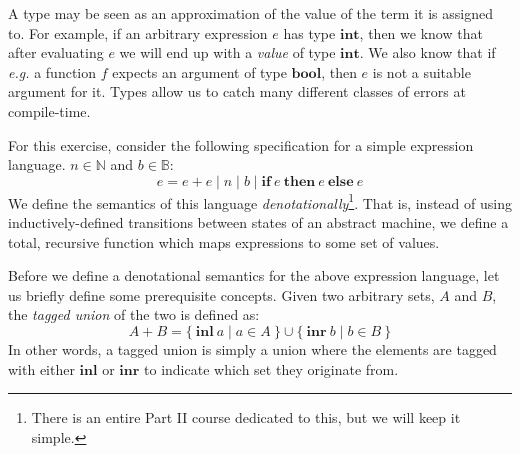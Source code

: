 \documentclass[10pt,a4paper]{exam}
\begin{document}
\begin{questions}
\question A type may be seen as an approximation of the value of the term it is assigned to. For example, if an arbitrary expression $e$ has type $\mathbf{int}$, then we know that after evaluating $e$ we will end up with a \emph{value} of type $\mathbf{int}$. We also know that if \emph{e.g.} a function $f$ expects an argument of type $\mathbf{bool}$, then $e$ is not a suitable argument for it. Types allow us to catch many different classes of errors at compile-time. 

For this exercise, consider the following specification for a simple expression language. $n \in \mathbb{N}$ and $b \in \mathbb{B}$:
\begin{displaymath}
e = e + e \mid n \mid b \mid \mathbf{if}~e~\mathbf{then}~e~\mathbf{else}~e
\end{displaymath}
We define the semantics of this language \emph{denotationally}\footnote{There is an entire Part II course dedicated to this, but we will keep it simple.}. That is, instead of using inductively-defined transitions between states of an abstract machine, we define a total, recursive function which maps expressions to some set of values.

Before we define a denotational semantics for the above expression language, let us briefly define some prerequisite concepts. Given two arbitrary sets, $A$ and $B$, the \emph{tagged union} of the two is defined as:
\begin{displaymath}
A + B = \{~\mathbf{inl}~a \mid a \in A~\} \cup \{~\mathbf{inr}~b \mid b \in B~\}
\end{displaymath}  
In other words, a tagged union is simply a union where the elements are tagged with either $\mathbf{inl}$ or $\mathbf{inr}$ to indicate which set they originate from.


\end{questions}
\end{document}
